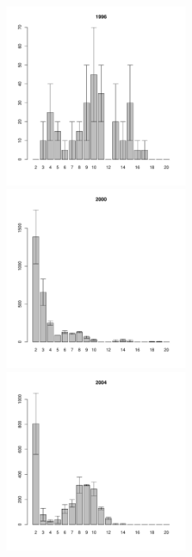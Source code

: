 \documentclass[12pt, a4paper]{article}
\begin{document}
\begin{figure}[h]
\begin{multicols}{3}
\hfill
\includegraphics[width=60mm]{../White_Sea/Ryashkov_ZRS/zrs2_1996_.pdf}
\hfill
\includegraphics[width=60mm]{../White_Sea/Ryashkov_ZRS/zrs2_2000_.pdf}
\hfill
\includegraphics[width=60mm]{../White_Sea/Ryashkov_ZRS/zrs2_2004_.pdf}
\end{multicols}



\end{figure}
\end{document}
